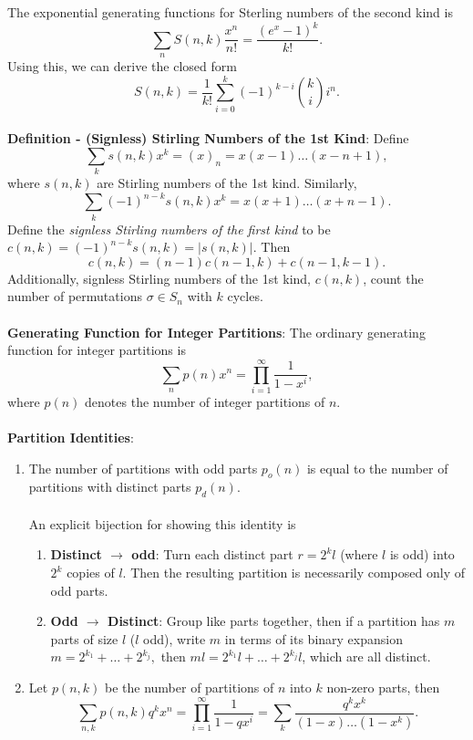 \documentclass{article}
\begin{document}
The exponential generating functions for Sterling numbers of the second kind is $$\sum_n S(n, k) \frac{x^n}{n!} = \frac{(e^x - 1)^k}{k!}.$$ Using this, we can derive the closed form $$S(n, k) = \frac{1}{k!} \sum_{i = 0}^k (-1)^{k - i} {k \choose i} i^n.$$ \\
\textbf{Definition - (Signless) Stirling Numbers of the 1st Kind}: Define $$\sum_k s(n, k) x^k = (x)_n = x(x - 1) \dots (x - n + 1),$$ where $s(n, k)$ are Stirling numbers of the 1st kind. Similarly, $$\sum_k (-1)^{n - k} s(n, k) x^k = x(x + 1) \dots (x + n - 1).$$ Define the \textit{signless Stirling numbers of the first kind} to be $c(n, k) = (-1)^{n - k} s(n, k) = |s(n, k)|$. Then $$c(n, k) = (n - 1)c(n - 1, k) + c(n - 1, k - 1).$$ Additionally, signless Stirling numbers of the 1st kind, $c(n, k)$, count the number of permutations $\sigma \in S_n$ with $k$ cycles. \\ \\
\textbf{Generating Function for Integer Partitions}: The ordinary generating function for integer partitions is $$\sum_n p(n)x^n = \prod_{i = 1}^\infty \frac{1}{1 - x^i},$$ where $p(n)$ denotes the number of integer partitions of $n$. \\ \\
\textbf{Partition Identities}: \begin{enumerate}
    \item The number of partitions with odd parts $p_o(n)$ is equal to the number of partitions with distinct parts $p_d(n)$. \\ \\
    An explicit bijection for showing this identity is \begin{enumerate}
        \item \textbf{Distinct $\rightarrow$ odd}: Turn each distinct part $r = 2^k l$ (where $l$ is odd) into $2^k$ copies of $l$. Then the resulting partition is necessarily composed only of odd parts.
        \item \textbf{Odd $\rightarrow$ Distinct}: Group like parts together, then if a partition has $m$ parts of size $l$ ($l$ odd), write $m$ in terms of its binary expansion $m = 2^{k_1} + \dots + 2^{k_j},$ then $ml = 2^{k_1}l + \dots + 2^{k_j}l$, which are all distinct.
    \end{enumerate}
    \item Let $p(n, k)$ be the number of partitions of $n$ into $k$ non-zero parts, then $$\sum_{n, k} p(n, k) q^k x^n = \prod_{i = 1}^\infty \frac{1}{1 - qx^i} = \sum_k \frac{q^k x^k}{(1 - x)\dots(1 - x^k)}.$$
\end{enumerate} $ $ \\
\end{document}
